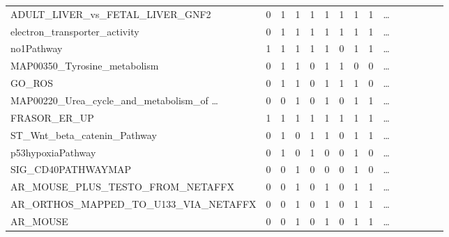 \documentclass{scrartcl}
\numberwithin{figure}{section}
\numberwithin{table}{section}
\begin{document}
\begin{table}[h!]
\begin{tabular}{lllllllllllllll}
    ADULT\_LIVER\_vs\_FETAL\_LIVER\_GNF2             & 0            & 1           & 1               & 1          & 1            & 1            & 1            & 1 & \dots \\
    electron\_transporter\_activity                  & 0            & 1           & 1               & 1          & 1            & 1            & 1            & 1 & \dots \\
    no1Pathway                                       & 1            & 1           & 1               & 1          & 1            & 0            & 1            & 1 & \dots \\
    MAP00350\_Tyrosine\_metabolism                   & 0            & 1           & 1               & 0          & 1            & 1            & 0            & 0 & \dots \\
    GO\_ROS                                          & 0            & 1           & 1               & 0          & 1            & 1            & 1            & 0 & \dots \\
    MAP00220\_Urea\_cycle\_and\_metabolism\_of \dots & 0            & 0           & 1               & 0          & 1            & 0            & 1            & 1 & \dots \\
    FRASOR\_ER\_UP                                   & 1            & 1           & 1               & 1          & 1            & 1            & 1            & 1 & \dots \\
    ST\_Wnt\_beta\_catenin\_Pathway                  & 0            & 1           & 0               & 1          & 1            & 0            & 1            & 1 & \dots \\
    p53hypoxiaPathway                                & 0            & 1           & 0               & 1          & 0            & 0            & 1            & 0 & \dots \\
    SIG\_CD40PATHWAYMAP                              & 0            & 0           & 1               & 0          & 0            & 0            & 1            & 0 & \dots \\
    AR\_MOUSE\_PLUS\_TESTO\_FROM\_NETAFFX            & 0            & 0           & 1               & 0          & 1            & 0            & 1            & 1 & \dots \\
    AR\_ORTHOS\_MAPPED\_TO\_U133\_VIA\_NETAFFX       & 0            & 0           & 1               & 0          & 1            & 0            & 1            & 1 & \dots \\
    AR\_MOUSE                                        & 0            & 0           & 1               & 0          & 1            & 0            & 1            & 1 & \dots \\

\end{tabular}
\end{table}
\end{document}
